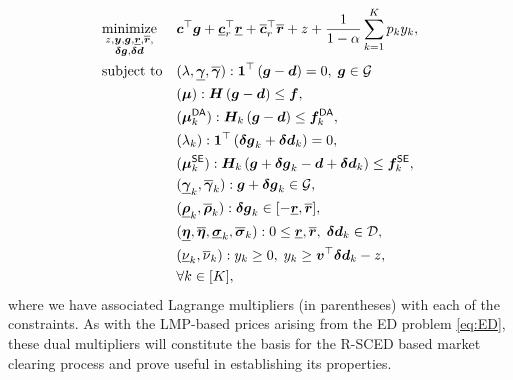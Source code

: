 \begin{subequations}
\label{eq:RSCED.lp}
\begin{flalign}
    &\underset{\substack{z, \v{y}, \v{g}, \underline{\v{r}}, \overline{\v{r}}, \\ \v{\delta g}, \v{\delta d}}}{\text{minimize}} && \v{c}^\top \v{g} + \underline{\v{c}}_r^\top \underline{\v{r}} + \overline{\v{c}}_r^\top \overline{\v{r}} + z + \frac{1}{1 - \alpha} \sum_{k = 1}^K p_k y_k, \\ %
    &\text{subject to} && (\lambda, \underline{\v{\gamma}}, \overline{\v{\gamma}}) : \bone^\top \left(\v{g} - \v{d}\right) = 0, \; \v{g} \in \Gcal \label{eq:RSCED.lp.nominal} \\
    &&& (\v{\mu}): \v{H} \left( \v{g} - \v{d} \right) \le \v{f},  \label{eq:RSCED.lp.lineflow}\\
    &&& (\v{\mu}_k^\DA{}): \v{H}_k \left( \v{g} - \v{d} \right) \le \v{f}_k^{\DA},  \label{eq:RSCED.lp.lineflow_k}\\
   &&& (\lambda_k): \bone^\top \left( \v{\delta g}_k + \v{\delta d}_k \right) = 0, \label{eq:RSCED.lp.se.balance} \\
    &&& (\v{\mu}_k^\SE{}): \v{H}_k \left( \v{g} + \v{\delta g}_k - \v{d} + \v{\delta d}_k \right) \le \v{f}_k^{\SE}, \label{eq:RSCED.lp.se.flow} \\
    &&& (\underline{\v{\gamma}}_k, \overline{\v{\gamma}}_k): \v{g} + \v{\delta g}_k \in \Gcal, \label{eq:RSCED.lp.se.genbounds} \\
    &&& (\underline{\v{\rho}}_k, \overline{\v{\rho}}_k): \v{\delta g}_k \in [-\underline{\v{r}}, \overline{\v{r}}], \label{eq:RSCED.lp.se.dgenbounds} \\
    &&& (\underline{\v{\eta}}, \overline{\v{\eta}}, \underline{\v{\sigma}}_k, \overline{\v{\sigma}}_k): 0 \le \underline{\v{r}}, \overline{\v{r}}, \; \v{\delta d}_k \in \mathcal{D}, \label{eq:RSCED.lp.se.bounds} \\
    &&& (\underline{\nu}_k, \overline{\nu}_k): y_k \ge 0, \; y_k \ge \voll^\top \v{\delta d}_k - z, \label{eq::RSCED.lp.epigraph}\\ %
    \nonumber&&& \forall k\in[K],
\end{flalign}
\end{subequations}
where we have associated Lagrange multipliers (in parentheses) with each of the constraints. As with the LMP-based prices arising from the ED problem \eqref{eq:ED}, these dual multipliers will constitute the basis for the R-SCED based market clearing process and prove useful in establishing its properties.

